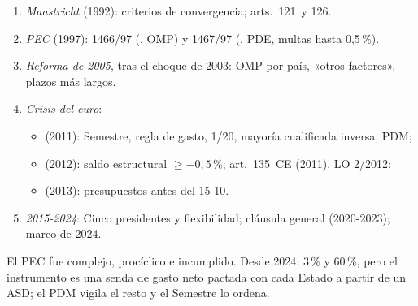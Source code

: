 \documentclass{article}
\begin{document}
\begin{columnas}
\begin{enumerate}
\item \emph{Maastricht} (1992): criterios de convergencia; arts.~121~y 126.
\item \emph{PEC} (1997): 1466/97 (, OMP) y 1467/97 (, PDE, multas hasta 0,5\,\%).
\item \emph{Reforma de 2005}, tras el choque de 2003: OMP por país, «otros factores», plazos más largos.
\item \emph{Crisis del euro}:
  \begin{itemize}
  \item {} (2011): Semestre, regla de gasto, 1/20, mayoría cualificada inversa, PDM;
  \item {} (2012): saldo estructural $\geq-0{,}5$\,\%; art.~135~CE (2011), LO 2/2012;
  \item {} (2013): presupuestos antes del 15-10.
  \end{itemize}
\item \emph{2015-2024}: Cinco presidentes y flexibilidad; cláusula general (2020-2023); marco de 2024.
\end{enumerate}

\begin{ideaclave}
El PEC fue complejo, procíclico e incumplido. Desde 2024: 3\,\% y 60\,\%, pero el instrumento es una senda de gasto neto pactada con cada Estado a partir de un ASD; el PDM vigila el resto y el Semestre lo ordena.
\end{ideaclave}


\end{columnas}
\end{document}
